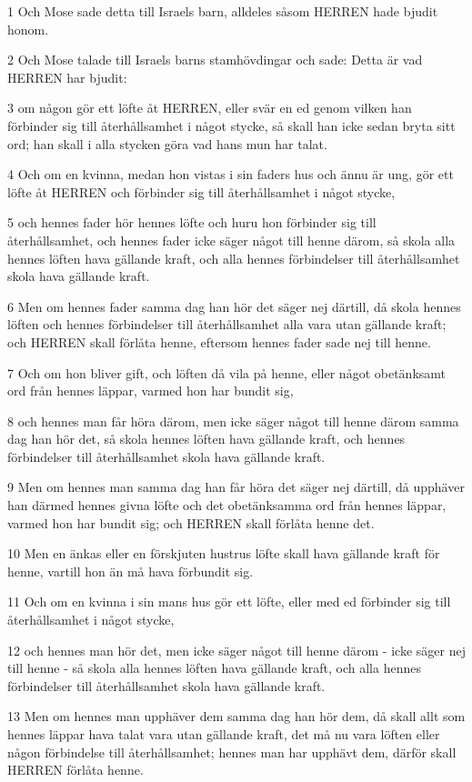 \par 1 Och Mose sade detta till Israels barn, alldeles såsom HERREN hade bjudit honom.
\par 2 Och Mose talade till Israels barns stamhövdingar och sade: Detta är vad HERREN har bjudit:
\par 3 om någon gör ett löfte åt HERREN, eller svär en ed genom vilken han förbinder sig till återhållsamhet i något stycke, så skall han icke sedan bryta sitt ord; han skall i alla stycken göra vad hans mun har talat.
\par 4 Och om en kvinna, medan hon vistas i sin faders hus och ännu är ung, gör ett löfte åt HERREN och förbinder sig till återhållsamhet i något stycke,
\par 5 och hennes fader hör hennes löfte och huru hon förbinder sig till återhållsamhet, och hennes fader icke säger något till henne därom, så skola alla hennes löften hava gällande kraft, och alla hennes förbindelser till återhållsamhet skola hava gällande kraft.
\par 6 Men om hennes fader samma dag han hör det säger nej därtill, då skola hennes löften och hennes förbindelser till återhållsamhet alla vara utan gällande kraft; och HERREN skall förlåta henne, eftersom hennes fader sade nej till henne.
\par 7 Och om hon bliver gift, och löften då vila på henne, eller något obetänksamt ord från hennes läppar, varmed hon har bundit sig,
\par 8 och hennes man får höra därom, men icke säger något till henne därom samma dag han hör det, så skola hennes löften hava gällande kraft, och hennes förbindelser till återhållsamhet skola hava gällande kraft.
\par 9 Men om hennes man samma dag han får höra det säger nej därtill, då upphäver han därmed hennes givna löfte och det obetänksamma ord från hennes läppar, varmed hon har bundit sig; och HERREN skall förlåta henne det.
\par 10 Men en änkas eller en förskjuten hustrus löfte skall hava gällande kraft för henne, vartill hon än må hava förbundit sig.
\par 11 Och om en kvinna i sin mans hus gör ett löfte, eller med ed förbinder sig till återhållsamhet i något stycke,
\par 12 och hennes man hör det, men icke säger något till henne därom - icke säger nej till henne - så skola alla hennes löften hava gällande kraft, och alla hennes förbindelser till återhållsamhet skola hava gällande kraft.
\par 13 Men om hennes man upphäver dem samma dag han hör dem, då skall allt som hennes läppar hava talat vara utan gällande kraft, det må nu vara löften eller någon förbindelse till återhållsamhet; hennes man har upphävt dem, därför skall HERREN förlåta henne.
